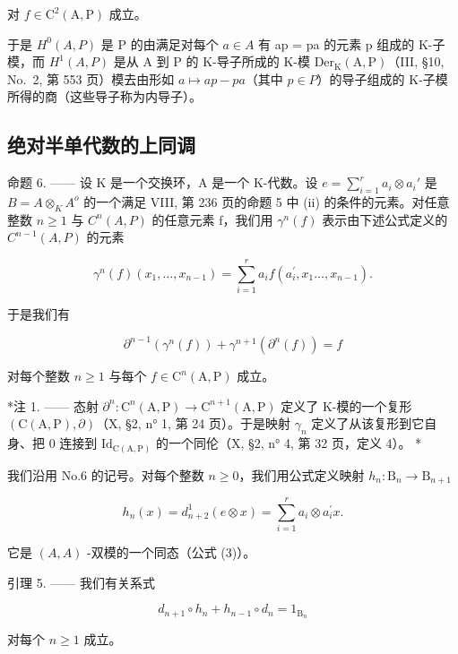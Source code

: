 对 \(f \in \mathrm{C}^2(\mathrm{A},\mathrm{P})\) 成立。

于是 \(H^{0}(A,P)\) 是 P 的由满足对每个 \(a \in A\) 有 ap = pa 的元素 p 组成的 K-子模，而 \(H^{1}(A,P)\) 是从 A 到 P 的 K-导子所成的 K-模 \(\mathrm{Der}_{\mathrm{K}}(\mathrm{A},\mathrm{P})\)（III, §10, No.~2, 第 553 页）模去由形如 \(a \mapsto ap - pa\)（其中 \(p \in P\)）的导子组成的 K-子模所得的商（这些导子称为内导子）。

\subsection{绝对半单代数的上同调}

命题 6. —— 设 K 是一个交换环，A 是一个 K-代数。设 \(e = \sum_{i=1}^{r} a_i \otimes a_i'\) 是 \(B = A \otimes_K A^o\) 的一个满足 VIII, 第 236 页的命题 5 中 (ii) 的条件的元素。对任意整数 \(n \geqslant 1\) 与 \(C^n(A, P)\) 的任意元素 f，我们用 \(\gamma^n(f)\) 表示由下述公式定义的 \(C^{n-1}(A, P)\) 的元素

\[
\gamma^ {n} (f) \left(x _ {1}, \dots , x _ {n - 1}\right) = \sum_ {i = 1} ^ {r} a _ {i} f \left(a _ {i} ^ {\prime}, x _ {1} \dots , x _ {n - 1}\right).\tag{15}
\]

于是我们有

\[
\partial^ {n - 1} (\gamma^ {n} (f)) + \gamma^ {n + 1} (\partial^ {n} (f)) = f\tag{16}
\]

对每个整数 \(n \geqslant 1\) 与每个 \(f \in \mathrm{C}^n(\mathrm{A},\mathrm{P})\) 成立。

*注 1. —— 态射 \(\partial^n: \mathrm{C}^n(\mathrm{A},\mathrm{P}) \to \mathrm{C}^{n+1}(\mathrm{A},\mathrm{P})\) 定义了 K-模的一个复形 \((\mathrm{C}(\mathrm{A},\mathrm{P}),\partial)\)（X, §2, n° 1, 第 24 页）。于是映射 \(\gamma_n\) 定义了从该复形到它自身、把 0 连接到 \(\mathrm{Id}_{\mathrm{C}(\mathrm{A},\mathrm{P})}\) 的一个同伦（X, §2, n° 4, 第 32 页，定义 4）。 *

我们沿用 No.6 的记号。对每个整数 \(n \geqslant 0\)，我们用公式定义映射 \(h_n: \mathrm{B}_n \to \mathrm{B}_{n+1}\)

\[
h _ {n} (x) = d _ {n + 2} ^ {1} (e \otimes x) = \sum_ {i = 1} ^ {r} a _ {i} \otimes a _ {i} ^ {\prime} x.
\]

它是 \((A, A)\) -双模的一个同态（公式 (3)）。

引理 5. —— 我们有关系式

\[
d _ {n + 1} \circ h _ {n} + h _ {n - 1} \circ d _ {n} = 1 _ {\mathrm{B} _ {n}}\tag{17}
\]

对每个 \(n \geqslant 1\) 成立。

